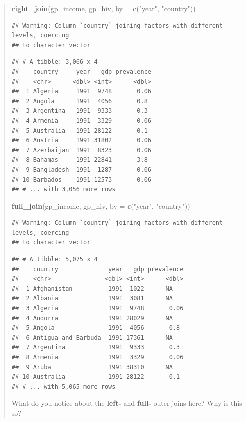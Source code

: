 \documentclass[]{book}
\newenvironment{Shaded}{\begin{snugshade}}{\end{snugshade}}
\newcommand{\KeywordTok}[1]{\textcolor[rgb]{0.13,0.29,0.53}{\textbf{{#1}}}}
\newcommand{\DataTypeTok}[1]{\textcolor[rgb]{0.13,0.29,0.53}{{#1}}}
\newcommand{\StringTok}[1]{\textcolor[rgb]{0.31,0.60,0.02}{{#1}}}
\newcommand{\NormalTok}[1]{{#1}}
\theoremstyle{definition}
\theoremstyle{definition}
\theoremstyle{definition}
\theoremstyle{remark}
\begin{document}
\begin{quote}
\begin{Shaded}
\begin{Highlighting}[]
\KeywordTok{right_join}\NormalTok{(gp_income, gp_hiv, }\DataTypeTok{by =} \KeywordTok{c}\NormalTok{(}\StringTok{"year"}\NormalTok{, }\StringTok{"country"}\NormalTok{))}
\end{Highlighting}
\end{Shaded}

\begin{verbatim}
## Warning: Column `country` joining factors with different levels, coercing
## to character vector
\end{verbatim}

\begin{verbatim}
## # A tibble: 3,066 x 4
##    country     year   gdp prevalence
##    <chr>      <dbl> <int>      <dbl>
##  1 Algeria     1991  9748       0.06
##  2 Angola      1991  4056       0.8 
##  3 Argentina   1991  9333       0.3 
##  4 Armenia     1991  3329       0.06
##  5 Australia   1991 28122       0.1 
##  6 Austria     1991 31802       0.06
##  7 Azerbaijan  1991  8323       0.06
##  8 Bahamas     1991 22841       3.8 
##  9 Bangladesh  1991  1287       0.06
## 10 Barbados    1991 12573       0.06
## # ... with 3,056 more rows
\end{verbatim}

\begin{Shaded}
\begin{Highlighting}[]
\KeywordTok{full_join}\NormalTok{(gp_income, gp_hiv, }\DataTypeTok{by =} \KeywordTok{c}\NormalTok{(}\StringTok{"year"}\NormalTok{, }\StringTok{"country"}\NormalTok{))}
\end{Highlighting}
\end{Shaded}

\begin{verbatim}
## Warning: Column `country` joining factors with different levels, coercing
## to character vector
\end{verbatim}

\begin{verbatim}
## # A tibble: 5,075 x 4
##    country              year   gdp prevalence
##    <chr>               <dbl> <int>      <dbl>
##  1 Afghanistan          1991  1022      NA   
##  2 Albania              1991  3081      NA   
##  3 Algeria              1991  9748       0.06
##  4 Andorra              1991 28029      NA   
##  5 Angola               1991  4056       0.8 
##  6 Antigua and Barbuda  1991 17361      NA   
##  7 Argentina            1991  9333       0.3 
##  8 Armenia              1991  3329       0.06
##  9 Aruba                1991 38310      NA   
## 10 Australia            1991 28122       0.1 
## # ... with 5,065 more rows
\end{verbatim}

What do you notice about the \textbf{left-} and \textbf{full-} outer
joins here? Why is this so?
\end{quote}
\end{document}

